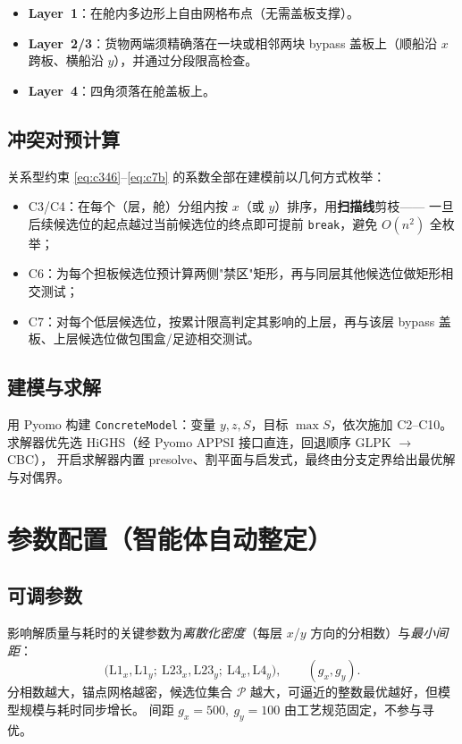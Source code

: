 \documentclass[11pt]{article}
\begin{document}
\begin{itemize}[leftmargin=1.8em,itemsep=2pt]
  \item \textbf{Layer~1}：在舱内多边形上自由网格布点（无需盖板支撑）。
  \item \textbf{Layer~2/3}：货物两端须精确落在一块或相邻两块 bypass 盖板上（顺船沿 $x$ 跨板、横船沿 $y$），并通过分段限高检查。
  \item \textbf{Layer~4}：四角须落在舱盖板上。
\end{itemize}

\subsection{冲突对预计算}
关系型约束 \eqref{eq:c346}--\eqref{eq:c7b} 的系数全部在建模前以几何方式枚举：
\begin{itemize}[leftmargin=1.8em,itemsep=2pt]
  \item C3/C4：在每个（层，舱）分组内按 $x$（或 $y$）排序，用\textbf{扫描线}剪枝——
  一旦后续候选位的起点越过当前候选位的终点即可提前 \texttt{break}，避免 $O(n^2)$ 全枚举；
  \item C6：为每个担板候选位预计算两侧"禁区"矩形，再与同层其他候选位做矩形相交测试；
  \item C7：对每个低层候选位，按累计限高判定其影响的上层，再与该层 bypass 盖板、上层候选位做包围盒/足迹相交测试。
\end{itemize}

\subsection{建模与求解}
用 Pyomo 构建 \texttt{ConcreteModel}：变量 $y,z,S$，目标 $\max S$，依次施加 C2--C10。
求解器优先选 HiGHS（经 Pyomo APPSI 接口直连，回退顺序 GLPK $\to$ CBC），
开启求解器内置 presolve、割平面与启发式，最终由分支定界给出最优解与对偶界。

\section{参数配置（智能体自动整定）}
\label{sec:param}

\subsection{可调参数}
影响解质量与耗时的关键参数为\emph{离散化密度}（每层 $x$/$y$ 方向的分相数）与\emph{最小间距}：
\[
\big(\text{L1}_x,\text{L1}_y;\ \text{L23}_x,\text{L23}_y;\ \text{L4}_x,\text{L4}_y\big),
\qquad (g_x,g_y).
\]
分相数越大，锚点网格越密，候选位集合 $\mathcal{P}$ 越大，可逼近的整数最优越好，但模型规模与耗时同步增长。
间距 $g_x=500,\ g_y=100$ 由工艺规范固定，不参与寻优。
\end{document}
